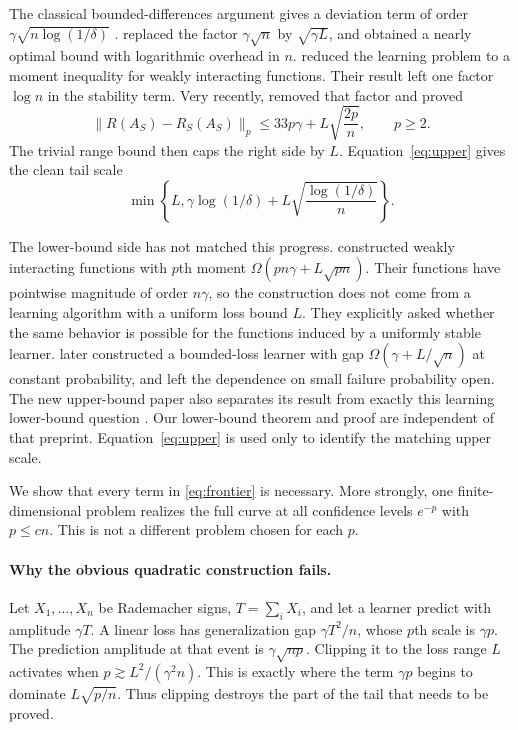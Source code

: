 \documentclass{article}
\newcommand{\1}{\mathbf 1}
\begin{document}
The classical bounded-differences argument gives a deviation term of order $\gamma\sqrt{n\log(1/\delta)}$ \citep{bousquet2002}. \citet{feldman2018} replaced the factor $\gamma\sqrt n$ by $\sqrt{\gamma L}$, and \citet{feldman2019} obtained a nearly optimal bound with logarithmic overhead in $n$. \citet{bousquet2020} reduced the learning problem to a moment inequality for weakly interacting functions. Their result left one factor $\log n$ in the stability term. Very recently, \citet{nguyen2026} removed that factor and proved
\begin{equation}
 \|R(A_S)-R_S(A_S)\|_p
 \le 33p\gamma+L\sqrt{\frac{2p}{n}},
 \qquad p\ge2.
 \label{eq:upper}
\end{equation}
The trivial range bound then caps the right side by $L$. Equation~\eqref{eq:upper} gives the clean tail scale
\begin{equation}
 \min\!\left\{L,\gamma\log(1/\delta)
 +L\sqrt{\frac{\log(1/\delta)}{n}}\right\}.
 \label{eq:frontier}
\end{equation}

The lower-bound side has not matched this progress. \citet{bousquet2020} constructed weakly interacting functions with $p$th moment $\Omega(pn\gamma+L\sqrt{pn})$. Their functions have pointwise magnitude of order $n\gamma$, so the construction does not come from a learning algorithm with a uniform loss bound $L$. They explicitly asked whether the same behavior is possible for the functions induced by a uniformly stable learner. \citet{liulu2021} later constructed a bounded-loss learner with gap $\Omega(\gamma+L/\sqrt n)$ at constant probability, and left the dependence on small failure probability open. The new upper-bound paper also separates its result from exactly this learning lower-bound question \citep{nguyen2026}. Our lower-bound theorem and proof are independent of that preprint. Equation~\eqref{eq:upper} is used only to identify the matching upper scale.

We show that every term in \eqref{eq:frontier} is necessary. More strongly, one finite-dimensional problem realizes the full curve at all confidence levels $e^{-p}$ with $p\le cn$. This is not a different problem chosen for each $p$.

\paragraph{Why the obvious quadratic construction fails.}
Let $X_1,\ldots,X_n$ be Rademacher signs, $T=\sum_iX_i$, and let a learner predict with amplitude $\gamma T$. A linear loss has generalization gap $\gamma T^2/n$, whose $p$th scale is $\gamma p$. The prediction amplitude at that event is $\gamma\sqrt{np}$. Clipping it to the loss range $L$ activates when $p\gtrsim L^2/(\gamma^2n)$. This is exactly where the term $\gamma p$ begins to dominate $L\sqrt{p/n}$. Thus clipping destroys the part of the tail that needs to be proved.
\end{document}
